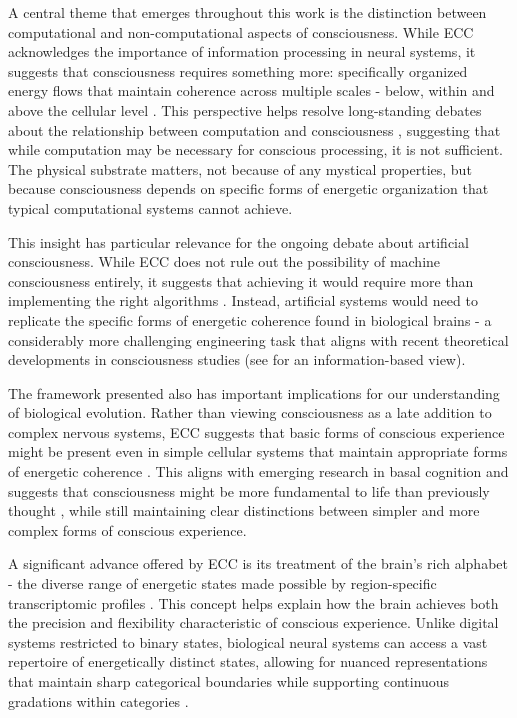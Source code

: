 A central theme that emerges throughout this work is the distinction between computational and non-computational aspects of consciousness. While ECC acknowledges the importance of information processing in neural systems, it suggests that consciousness requires something more: specifically organized energy flows that maintain coherence across multiple scales - below, within and above the cellular level \cite{margulis2001conscious}. This perspective helps resolve long-standing debates about the relationship between computation and consciousness \cite{dennett1993consciousness}, suggesting that while computation may be necessary for conscious processing, it is not sufficient. The physical substrate matters, not because of any mystical properties, but because consciousness depends on specific forms of energetic organization that typical computational systems cannot achieve.

This insight has particular relevance for the ongoing debate about artificial consciousness. While ECC does not rule out the possibility of machine consciousness entirely, it suggests that achieving it would require more than implementing the right algorithms \cite{block1995confusion}. Instead, artificial systems would need to replicate the specific forms of energetic coherence found in biological brains - a considerably more challenging engineering task that aligns with recent theoretical developments in consciousness studies (see \cite{tononi2015consciousness} for an information-based view).

The framework presented also has important implications for our understanding of biological evolution. Rather than viewing consciousness as a late addition to complex nervous systems, ECC suggests that basic forms of conscious experience might be present even in simple cellular systems that maintain appropriate forms of energetic coherence \cite{margulis2001conscious}. This aligns with emerging research in basal cognition and suggests that consciousness might be more fundamental to life than previously thought \cite{levin2019computational,Lyon2021}, while still maintaining clear distinctions between simpler and more complex forms of conscious experience.

A significant advance offered by ECC is its treatment of the brain's rich alphabet - the diverse range of energetic states made possible by region-specific transcriptomic profiles \cite{Tasic2018}. This concept helps explain how the brain achieves both the precision and flexibility characteristic of conscious experience. Unlike digital systems restricted to binary states, biological neural systems can access a vast repertoire of energetically distinct states, allowing for nuanced representations that maintain sharp categorical boundaries while supporting continuous gradations within categories \cite{Freedman2011}.

